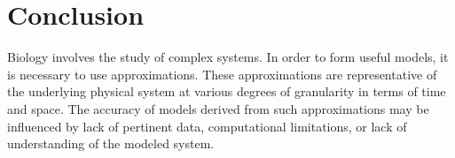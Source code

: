 \documentclass[journal,transmag,twoside]{IEEEtran}
\begin{document}
%






\section{Conclusion}
Biology involves the study of complex systems.
In order to form useful models, it is necessary to use approximations.
These approximations are representative of the underlying physical
system at various degrees of granularity in terms of time and space.
The accuracy of models derived from such approximations may be influenced
by lack of pertinent data, computational limitations, or lack of
understanding of the modeled system.
\end{document}
